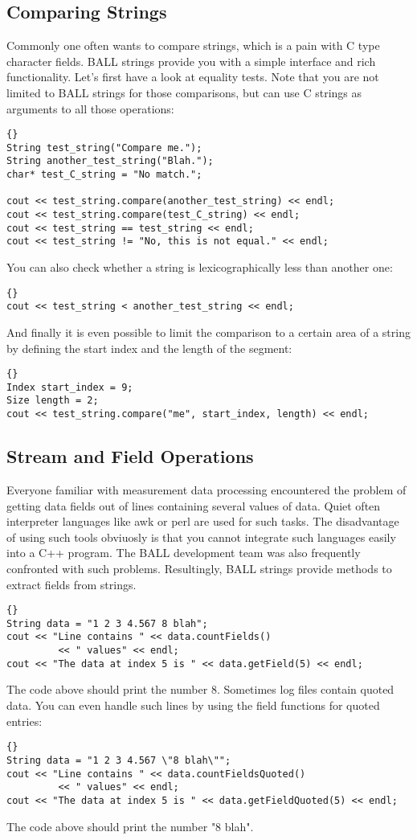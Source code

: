 \subsection{Comparing Strings}

Commonly one often wants to compare strings, which is a pain with C type
character fields. BALL strings provide you with a simple interface and rich
functionality. Let's first have a look at equality tests. Note that you are
not limited to BALL strings for those comparisons, but can use C strings
as arguments to all those operations:
\begin{lstlisting}{}
String test_string("Compare me.");
String another_test_string("Blah.");
char* test_C_string = "No match.";

cout << test_string.compare(another_test_string) << endl;
cout << test_string.compare(test_C_string) << endl;
cout << test_string == test_string << endl;
cout << test_string != "No, this is not equal." << endl;
\end{lstlisting}
You can also check whether a string is lexicographically less than another
one:
\begin{lstlisting}{}
cout << test_string < another_test_string << endl;
\end{lstlisting}
And finally it is even possible to limit the comparison to a certain area of
a string by defining the start index and the length of the segment:
\begin{lstlisting}{}
Index start_index = 9;
Size length = 2;
cout << test_string.compare("me", start_index, length) << endl;
\end{lstlisting}

\subsection{Stream and Field Operations}

Everyone familiar with measurement data processing encountered the problem of
getting data fields out of lines containing several values of data. Quiet
often interpreter languages like awk or perl are used for such tasks. The
disadvantage of using such tools obviuosly is that you cannot integrate such
languages easily into a C++ program. The BALL development team was also
frequently confronted with such problems. Resultingly, BALL strings provide
methods to extract fields from strings.
\begin{lstlisting}{}
String data = "1 2 3 4.567 8 blah";
cout << "Line contains " << data.countFields() 
		 << " values" << endl;
cout << "The data at index 5 is " << data.getField(5) << endl;
\end{lstlisting}
The code above should print the number 8.
Sometimes log files contain quoted data. You can even handle such lines by
using the field functions for quoted entries:
\begin{lstlisting}{}
String data = "1 2 3 4.567 \"8 blah\"";
cout << "Line contains " << data.countFieldsQuoted() 
		 << " values" << endl;
cout << "The data at index 5 is " << data.getFieldQuoted(5) << endl;
\end{lstlisting}
The code above should print the number "8 blah".


